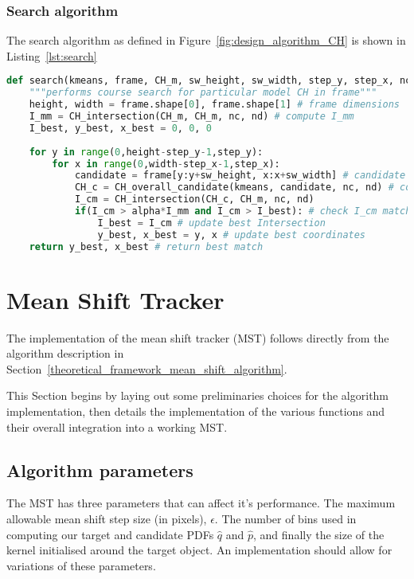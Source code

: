 \subsubsection{Search algorithm}
The search algorithm as defined in Figure~\ref{fig:design_algorithm_CH} is shown
in Listing~\ref{lst:search}
\begin{lstlisting}[language=Python, caption={CCH detection search algorithm}, captionpos=b, label={lst:search}]
def search(kmeans, frame, CH_m, sw_height, sw_width, step_y, step_x, nc, nd, alpha):
    """performs course search for particular model CH in frame"""
    height, width = frame.shape[0], frame.shape[1] # frame dimensions 
    I_mm = CH_intersection(CH_m, CH_m, nc, nd) # compute I_mm 
    I_best, y_best, x_best = 0, 0, 0
    
    for y in range(0,height-step_y-1,step_y):
        for x in range(0,width-step_x-1,step_x):
            candidate = frame[y:y+sw_height, x:x+sw_width] # candidate window 
            CH_c = CH_overall_candidate(kmeans, candidate, nc, nd) # compute candidate CH
            I_cm = CH_intersection(CH_c, CH_m, nc, nd)
            if(I_cm > alpha*I_mm and I_cm > I_best): # check I_cm match against threshold and best match
                I_best = I_cm # update best Intersection
                y_best, x_best = y, x # update best coordinates            
    return y_best, x_best # return best match
\end{lstlisting}

\section{Mean Shift Tracker}\label{implementation_mean_shift_tracker}
The implementation of the mean shift tracker (MST) follows directly from the algorithm
description in Section~\ref{theoretical_framework_mean_shift_algorithm}.

This Section begins by laying out some preliminaries choices for the algorithm
implementation, then details the implementation of the various functions and
their overall integration into a working MST\@. 

\subsection{Algorithm parameters}
The MST has three parameters that can affect it's performance.
The maximum allowable mean shift step size (in pixels), $\epsilon$. The number
of bins used in computing our target and candidate PDFs $\hat{q}$ and
$\hat{p}$, and finally the size of the kernel initialised around the target
object.
An implementation should allow for variations of these parameters.

